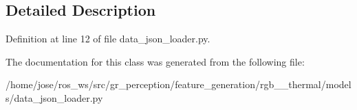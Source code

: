 \subsection{Detailed Description}


Definition at line 12 of file data\+\_\+json\+\_\+loader.\+py.



The documentation for this class was generated from the following file\+:\begin{DoxyCompactItemize}
\item 
/home/jose/ros\+\_\+ws/src/gr\+\_\+perception/feature\+\_\+generation/rgb\+\_\+\_\+thermal/models/data\+\_\+json\+\_\+loader.\+py\end{DoxyCompactItemize}
